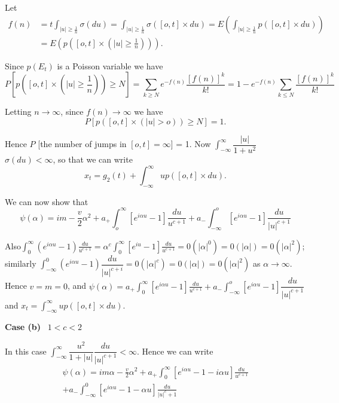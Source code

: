   Let 
  \begin{align*}
    f(n) & = t \int_{|  u | \ge \frac{1}{n}} \sigma (du) = \int_{|  u
    | \ge \frac{1}{n}} \sigma ([o,t] \times du) = E \left(\int_{|  u | \ge
    \frac{1}{n}} p([o,t] \times du)\right)\\
    &=E \left(p\left( [o,t] \times \left( | u | \ge
    \frac{1}{n}\right)\right)\right). 
  \end{align*}


Since $p(E_t)$ is a Poisson variable we have
$$
P \left[p ([o,t] \times (| u | \ge \frac{1}{n})) \ge N \right] =
\sum_{k \ge N} e^{-f (n)} \frac{[f(n)]^k}{k!} = 1 - e^{-f (n)} \sum_{k
  \le N} \frac{[f(n)]^k}{k!} 
$$

Letting $n \to \infty$, since $f(n) \to \infty$ we have 
$$
P[p ([o,t] \times ( | u | > o )) \ge N ] =1.
$$

Hence  $P$ [the number of jumps in $[o,t] = \infty $] = 1. Now
$\int_{- \infty}^\infty \dfrac{ | u |}{1+u^2}$ $\sigma (du) < \infty$,
so that we can write 
$$
x_t = g_2 (t)  +  \int_{- \infty}^\infty u p ([o,t] \times du).  
$$

We can now  show that 
$$
\psi (\alpha) = i m - \frac{v}{2} \alpha^2 +  a_+ \int_{o}^\infty
     [e^{i \alpha u}-1] \frac{du}{u^{c+1}}+ a_ -\int_{- \infty}^o
     [e^{i \alpha u}-1] \frac{du}{| u |^{c+1}} 
$$

Also\pageoriginale $\int_{0}^\infty (e^{i \alpha u}-1)
\frac{du}{u^{c+1}} =\alpha^c 
\int_{0}^\infty [e^{iu}-1] \frac{du}{u^{c+1}} = 0 (| \alpha |^0) =0 (
| \alpha | ) = 0 ( | \alpha |^2)$; 
similarly $\int_{- \infty}^0 ( e^{ i \alpha u}-1) \dfrac{du}{|u|^{c+i}}
= 0 ( | \alpha |^c )= 0 (|\alpha|) =0 ( | \alpha |^2 )$ as $\alpha \to
\infty$. Hence $v= m =0$, and $\psi ( \alpha) = a_+ \int_{0}^\infty
      [e^{i \alpha u}-1] \frac{du}{u^{c+1}} +  a_ - \int_{- \infty}^o [ e^{i \alpha
          u}-1] \dfrac{du}{| u |^{c+1}}$ and $x_t = \int_{-
        \infty}^\infty u p ( [o, t] \times du)$. 

\medskip
\noindent
{\bf Case (b)}~ $1 < c < 2$

  In this case $\int_{- \infty}^\infty \dfrac{u^2}{1 +  |  u |}
  \dfrac{du}{| u |^{c+1}} < \infty$. Hence we can write  
  \begin{multline*}
  \psi ( \alpha ) = im \alpha - \frac{v}{2} \alpha^2 +  a_ +
  \int_{0}^\infty \left[e^{i \alpha u}-1- i \alpha u\right] \frac{du}{u^{c+1}}\\ 
  + a_- \int_{- \infty}^0 \left[ e^{ i \alpha u}-1- \alpha u \right] \frac{du}{| u
    |^c +1} 
  \end{multline*}


